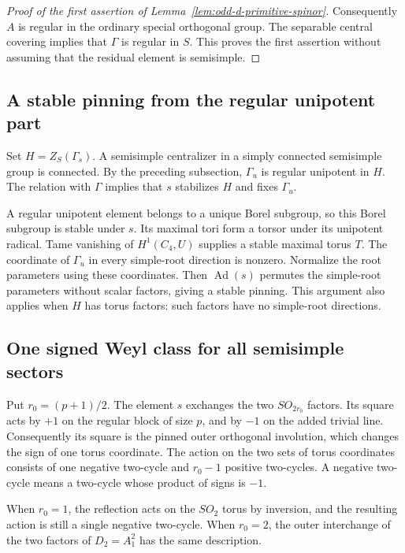 \documentclass[11pt,a4paper]{article}
\theoremstyle{definition}
\theoremstyle{remark}
\begin{document}
\begin{proof}[Proof of the first assertion of
Lemma~\ref{lem:odd-d-primitive-spinor}]
Consequently \(A\) is regular in the ordinary special orthogonal group.
The separable central covering implies that \(\Gamma\) is regular in
\(S\).  This proves the first assertion without assuming that the
residual element is semisimple.
\end{proof}

\subsection{A stable pinning from the regular unipotent part}

Set \(H=Z_S(\Gamma_s)\).  A semisimple centralizer in a simply connected
semisimple group is connected.  By the preceding subsection,
\(\Gamma_u\) is regular unipotent in \(H\).
The relation with \(\Gamma\) implies that \(s\) stabilizes \(H\) and
fixes \(\Gamma_u\).

A regular unipotent element belongs to a unique Borel subgroup, so
this Borel subgroup is stable under \(s\).
Its maximal tori form a torsor under its unipotent radical.
Tame vanishing of \(H^1(C_4,U)\) supplies a stable maximal torus \(T\).
The coordinate of \(\Gamma_u\) in every simple-root direction is
nonzero.  Normalize the root parameters using these coordinates.
Then \(\operatorname{Ad}(s)\) permutes the simple-root parameters without
scalar factors, giving a stable pinning.
This argument also applies when \(H\) has torus factors: such factors
have no simple-root directions.

\subsection{One signed Weyl class for all semisimple sectors}

Put \(r_0=(p+1)/2\).
The element \(s\) exchanges the two \(SO_{2r_0}\) factors.
Its square acts by \(+1\) on the regular block of size \(p\), and by
\(-1\) on the added trivial line.
Consequently its square is the pinned outer orthogonal involution,
which changes the sign of one torus coordinate.
The action on the two sets of torus coordinates consists of one
negative two-cycle and \(r_0-1\) positive two-cycles.
A negative two-cycle means a two-cycle whose product of signs is
\(-1\).

When \(r_0=1\), the reflection acts on the \(SO_2\) torus by inversion,
and the resulting action is still a single negative two-cycle.
When \(r_0=2\), the outer interchange of the two factors of
\(D_2=A_1^2\) has the same description.
\end{document}
